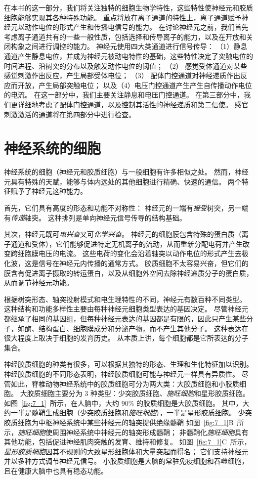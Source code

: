 在本书的这一部分，我们将关注独特的细胞生物学特性，这些特性使神经元和胶质细胞能够实现其各种特殊功能。
重点将放在离子通道的特性上，离子通道赋予神经元以动作电位的形式产生和传播电信号的能力。
在讨论神经元之前，我们首先考虑离子通道共有的一些一般性质，包括选择和传导离子的能力，以及在开放和关闭构象之间进行调控的能力。
神经元使用四大类通道进行信号传导：
（1）静息通道产生静息电位，并成为神经元被动电特性的基础，这些特性决定了突触电位的时间进程、沿树突的分布以及触发动作电位的阈值；
（2） 感觉受体通道对某些感觉刺激作出反应，产生局部受体电位；
（3） 配体门控通道对神经递质作出反应而开放，产生局部突触电位；
以及（4）电压门控通道产生产生自传播动作电位的电流。
在这一部分中，我们主要关注静息和电压门控通道。
在第三部分中，我们更详细地考虑了配体门控通道，以及控制其活性的神经递质和第二信使。
感官刺激激活的通道将在第四部分中进行检查。




\chapter{神经系统的细胞} \label{chap:chap7}

神经系统的细胞（神经元和胶质细胞）与一般细胞有许多相似之处。
然而，神经元具有特殊的天赋，能够与体内远处的其他细胞进行精确、快速的通信。
两个特征赋予了神经元这种能力。


首先，它们具有高度的形态和功能不对称性：
神经元的一端有\textit{接受}树突，另一端有\textit{传递}轴突。
这种排列是单向神经元信号传导的结构基础。


其次，神经元既可\textit{电兴奋}又可\textit{化学兴奋}。
神经元的细胞膜包含特殊的蛋白质（离子通道和受体），它们能够促进特定无机离子的流动，从而重新分配电荷并产生改变跨细胞膜电压的电流。
这些电荷的变化会沿着轴突以动作电位的形式产生去极化波，这是信号在神经元内传播的通常方式。
胶质细胞不太容易兴奋，但它们的膜含有促进离子摄取的转运蛋白，以及从细胞外空间去除神经递质分子的蛋白质，从而调节神经元功能。


根据树突形态、轴突投射模式和电生理特性的不同，神经元有数百种不同类型。
这种结构和功能多样性主要由每种神经元细胞类型表达的基因决定。
尽管神经元都继承了相同的基因组，但每种神经元表达的基因都是有限的，因此只产生某些分子，如酶、结构蛋白、细胞膜成分和分泌产物，而不产生其他分子。
这种表达在很大程度上取决于细胞的发育历史。
从本质上讲，每个细胞都是它所表达的分子集合。


神经胶质细胞的种类有很多，可以根据其独特的形态、生理和生化特征加以识别。
神经胶质细胞的不同形态表明，神经胶质细胞可能与神经元一样具有异质性。
尽管如此，脊椎动物神经系统中的胶质细胞可分为两大类：大胶质细胞和小胶质细胞。
大胶质细胞主要分为 3 种类型：少突胶质细胞、\textit{施旺细胞}和星形胶质细胞。
如图~\ref{fig:7_1}~所示，在人脑中，大约 90\% 的胶质细胞是大胶质细胞。
其中，大约一半是髓鞘生成细胞（少突胶质细胞和\textit{施旺细胞}），一半是星形胶质细胞。
少突胶质细胞为中枢神经系统中某些神经元的轴突提供绝缘髓鞘
如图~\ref{fig:7_1}B~所示，\textit{施旺细胞}使周围神经系统中神经元的轴突形成髓鞘；
非髓鞘化\textit{施旺细胞}具有其他功能，包括促进神经肌肉突触的发育、维持和修复。
如图~\ref{fig:7_1}C~所示，\textit{星形胶质细胞}因其不规则的大致星形细胞体和大量突起而得名；
它们支持神经元并以多种方式调节神经元信号。 
小胶质细胞是大脑的常驻免疫细胞和吞噬细胞，且在健康大脑中也具有稳态功能。


